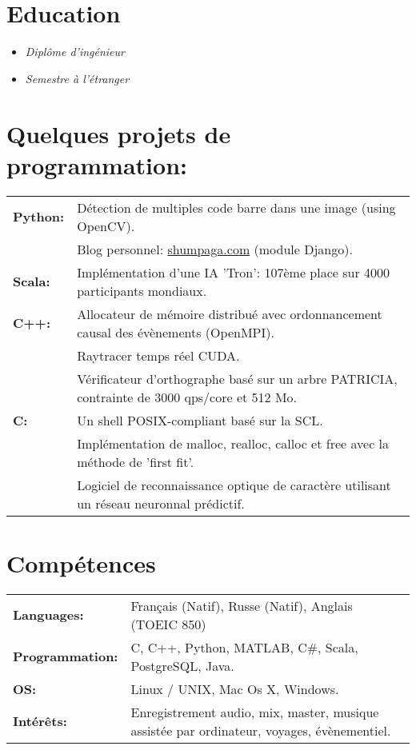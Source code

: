 \documentclass[11pt,a4paper,sans]{moderncv}
\begin{document}
\section{Education}
\begin{itemize}
\setlength\itemsep{-0.2cm}
\item{ {\textit{Diplôme d'ingénieur}}{}}
\item{ {\textit{Semestre à l'étranger}}{}}
\end{itemize}


\section{Quelques projets de programmation:}
\setlength{\tabcolsep}{3pt}
\renewcommand{\arraystretch}{1.2}
\begin{tabular}{ll}
  \textbf{Python:} & Détection de multiples code barre dans une image (using OpenCV).\\
& Blog personnel: \url{shumpaga.com} (module Django).\\
\textbf{Scala:} & Implémentation d'une IA 'Tron': 107ème place sur 4000 participants mondiaux.\\
  \textbf{C++:} & Allocateur de mémoire distribué avec ordonnancement causal des évènements (OpenMPI).\\
& Raytracer temps réel CUDA.\\
& Vérificateur d'orthographe basé sur un arbre PATRICIA, contrainte de 3000 qps/core et 512 Mo.\\
\textbf{C:} & Un shell POSIX-compliant basé sur la SCL.\\
& Implémentation de malloc, realloc, calloc et free avec la méthode de 'first fit'.\\
& Logiciel de reconnaissance optique de caractère utilisant un réseau neuronnal prédictif.\\
\end{tabular}

\section{Compétences}
\setlength{\tabcolsep}{3pt}
\renewcommand{\arraystretch}{1.2}
\begin{tabular}{ll}
\textbf{Languages:} & Français (Natif), Russe (Natif), Anglais (TOEIC 850)\\
\textbf{Programmation:} & C, C++, Python, MATLAB, C\#, Scala, PostgreSQL, Java.\\
\textbf{OS:} & Linux / UNIX, Mac Os X, Windows.\\
\textbf{Intérêts:} & Enregistrement audio, mix, master, musique assistée par ordinateur, voyages, évènementiel.
\end{tabular}
\end{document}
